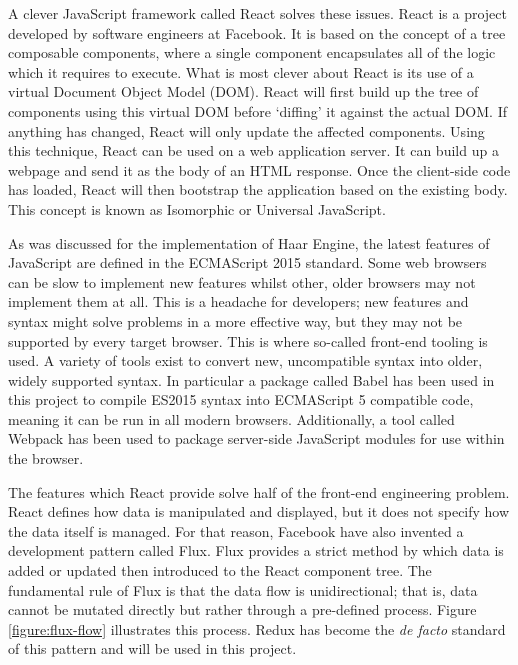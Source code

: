       A clever JavaScript framework called React solves these issues. React is a project developed by software engineers at Facebook. It is based on the concept of a tree composable components, where a single component encapsulates all of the logic which it requires to execute. What is most clever about React is its use of a virtual Document Object Model (DOM). React will first build up the tree of components using this virtual DOM before `diffing' it against the actual DOM. If anything has changed, React will only update the affected components. Using this technique, React can be used on a web application server. It can build up a webpage and send it as the body of an HTML response. Once the client-side code has loaded, React will then bootstrap the application based on the existing body. This concept is known as Isomorphic or Universal JavaScript.

      As was discussed for the implementation of Haar Engine, the latest features of JavaScript are defined in the ECMAScript 2015 standard. Some web browsers can be slow to implement new features whilst other, older browsers may not implement them at all. This is a headache for developers; new features and syntax might solve problems in a more effective way, but they may not be supported by every target browser. This is where so-called front-end tooling is used. A variety of tools exist to convert new, uncompatible syntax into older, widely supported syntax. In particular a package called Babel has been used in this project to compile ES2015 syntax into ECMAScript 5 compatible code, meaning it can be run in all modern browsers. Additionally, a tool called Webpack has been used to package server-side JavaScript modules for use within the browser.

      The features which React provide solve half of the front-end engineering problem. React defines how data is manipulated and displayed, but it does not specify how the data itself is managed. For that reason, Facebook have also invented a development pattern called Flux. Flux provides a strict method by which data is added or updated then introduced to the React component tree. The fundamental rule of Flux is that the data flow is unidirectional; that is, data cannot be mutated directly but rather through a pre-defined process. Figure \ref{figure:flux-flow} illustrates this process. Redux has become the \textit{de facto} standard of this pattern and will be used in this project.

